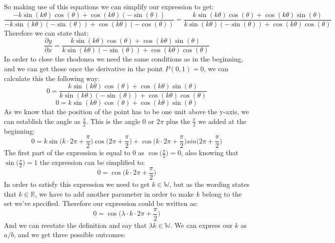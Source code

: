 \documentclass[12pt, a4paper]{article}
\begin{document}
So making use of this equations we can simplify our expression to get:
\begin{dmath}
 \frac{-k\sin(k\theta)\cos(\theta) + \cos(k\theta)(-\sin(\theta))}{-k\sin(k\theta)(-\sin(\theta)) + \cos(k\theta)(-\cos(\theta))} = \frac{k\sin(k\theta)\cos(\theta)+\cos(k\theta)\sin(\theta)}{k\sin(k\theta)(-\sin(\theta)) + \cos(k\theta)\cos(\theta)}
\end{dmath}
Therefore we can state that:
\begin{dmath}
 \frac{\partial y}{\partial x} = \frac{k\sin(k\theta)\cos(\theta)+\cos(k\theta)\sin(\theta)}{k\sin(k\theta)(-\sin(\theta)) + \cos(k\theta)\cos(\theta)}
\end{dmath}
In order to close the rhodonea we need the same conditions as in the beginning, and we can get those once the derivative in the point $P(0,1) = 0$, we can calculate this the following way:
\begin{dmath}
 0 = \frac{k\sin(k\theta)\cos(\theta) + \cos(k\theta)\sin(\theta)}{k\sin(k\theta)(-\sin(\theta)) + \cos(k\theta)\cos(\theta)}
\end{dmath}
\begin{dmath}
 0 = k\sin(k\theta)\cos(\theta)+\cos(k\theta)\sin(\theta)
\end{dmath}
As we know that the position of the point has to be one unit above the y-axis, we can establish the angle as $\frac{\pi}{2}$. This is the angle $0$ or $2\pi$ plus the $\frac{\pi}{2}$ we added at the beginning:
\begin{equation}
 0 = k\sin\Bigr(k\cdot2\pi+\frac{\pi}{2}\Bigr)\cos\Bigr(2\pi+\frac{\pi}{2}\Bigr)+\cos\Bigr(k\cdot2\pi+\frac{\pi}{2}\Bigr)sin\Bigr(2\pi+\frac{\pi}{2}\Bigr)
\end{equation}
The first part of the expression is equal to $0$ as $\cos\Bigr(\frac{\pi}{2}\Bigr) = 0$, also knowing that $\sin\Bigr(\frac{\pi}{2}\Bigr) = 1$ the expression can be simplified to:
\begin{equation}
 0 = \cos\Bigr(k\cdot2\pi+\frac{\pi}{2}\Bigr)
\end{equation}
In order to satisfy this expression we need to get $k\in\mathbb{W}$, but as the wording states that $k\in\mathbb{R}$, we have to add another parameter in order to make $k$ belong to the set we've specified. Therefore our expression could be written as:
\begin{equation}
 0 = \cos\Bigr(\lambda\cdot k\cdot2\pi +\frac{\pi}{2}\Bigr)
\end{equation}
\newpage
And we can reestate the definition and say that $\lambda k \in \mathbb{W}$. We can express our $k$ as $a/b$, and we get three possible outcomes:
\end{document}
